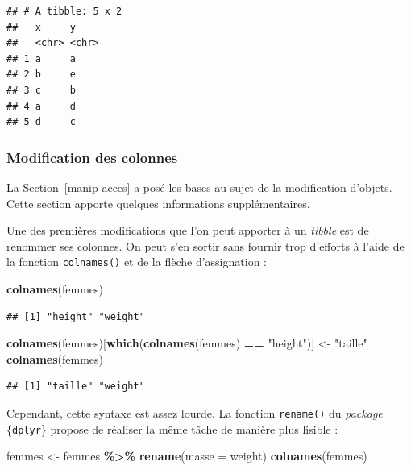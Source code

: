 \documentclass[
  11pt,
]{book}
\newenvironment{Shaded}{\begin{snugshade}}{\end{snugshade}}
\newcommand{\DataTypeTok}[1]{\textcolor[rgb]{0.13,0.29,0.53}{#1}}
\newcommand{\KeywordTok}[1]{\textcolor[rgb]{0.13,0.29,0.53}{\textbf{#1}}}
\newcommand{\NormalTok}[1]{#1}
\newcommand{\OperatorTok}[1]{\textcolor[rgb]{0.81,0.36,0.00}{\textbf{#1}}}
\newcommand{\StringTok}[1]{\textcolor[rgb]{0.31,0.60,0.02}{#1}}
\numberwithin{equation}{section}
\numberwithin{countremarque}{section}
\begin{document}
\begin{lstlisting}
## # A tibble: 5 x 2
##   x     y    
##   <chr> <chr>
## 1 a     a    
## 2 b     e    
## 3 c     b    
## 4 a     d    
## 5 d     c
\end{lstlisting}

\hypertarget{modification-des-colonnes}{%
\subsubsection{Modification des colonnes}\label{modification-des-colonnes}}

La Section~\ref{manip-acces} a posé les bases au sujet de la modification d'objets. Cette section apporte quelques informations supplémentaires.

Une des premières modifications que l'on peut apporter à un \emph{tibble} est de renommer ses colonnes. On peut s'en sortir sans fournir trop d'efforts à l'aide de la fonction \texttt{colnames()} et de la flèche d'assignation :

\begin{Shaded}
\begin{Highlighting}[]
\KeywordTok{colnames}\NormalTok{(femmes)}
\end{Highlighting}
\end{Shaded}

\begin{lstlisting}
## [1] "height" "weight"
\end{lstlisting}

\begin{Shaded}
\begin{Highlighting}[]
\KeywordTok{colnames}\NormalTok{(femmes)[}\KeywordTok{which}\NormalTok{(}\KeywordTok{colnames}\NormalTok{(femmes) }\OperatorTok{==}\StringTok{ "height"}\NormalTok{)] \textless{}{-}}\StringTok{ "taille"}
\KeywordTok{colnames}\NormalTok{(femmes)}
\end{Highlighting}
\end{Shaded}

\begin{lstlisting}
## [1] "taille" "weight"
\end{lstlisting}

Cependant, cette syntaxe est assez lourde. La fonction \texttt{rename()} du \emph{package} \{\texttt{dplyr}\} propose de réaliser la même tâche de manière plus lisible :

\begin{Shaded}
\begin{Highlighting}[]
\NormalTok{femmes \textless{}{-}}
\StringTok{  }\NormalTok{femmes }\OperatorTok{\%\textgreater{}\%}\StringTok{ }
\StringTok{  }\KeywordTok{rename}\NormalTok{(}\DataTypeTok{masse =}\NormalTok{ weight)}
\KeywordTok{colnames}\NormalTok{(femmes)}
\end{Highlighting}
\end{Shaded}
\end{document}
